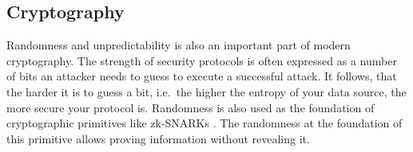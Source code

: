 \subsection{Cryptography}\label{subsec:usecase_cryptography}
Randomness and unpredictability is also an important part of modern cryptography. The strength of security protocols is often expressed as a number of bits an attacker needs to guess to execute a successful attack. It follows, that the harder it is to guess a bit, i.e.\ the higher the entropy of your data source, the more secure your protocol is. 
Randomness is also used as the foundation of cryptographic primitives like zk-SNARKs . The randomness at the foundation of this primitive allows proving information without revealing it.
